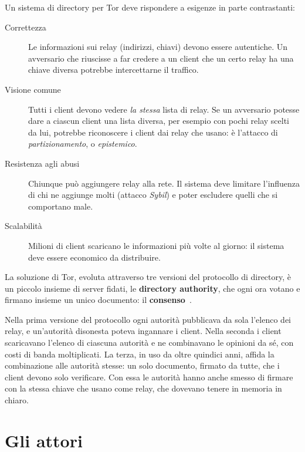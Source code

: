 Un sistema di directory per Tor deve rispondere a esigenze in parte contrastanti:
\begin{description}
  \item[Correttezza] Le informazioni sui relay (indirizzi, chiavi) devono essere autentiche. Un avversario che riuscisse a far credere a un client che un certo relay ha una chiave diversa potrebbe intercettarne il traffico.
  \item[Visione comune] Tutti i client devono vedere \emph{la stessa} lista di relay. Se un avversario potesse dare a ciascun client una lista diversa, per esempio con pochi relay scelti da lui, potrebbe riconoscere i client dai relay che usano: è l'attacco di \emph{partizionamento}, o \emph{epistemico}.
  \item[Resistenza agli abusi] Chiunque può aggiungere relay alla rete. Il sistema deve limitare l'influenza di chi ne aggiunge molti (attacco \emph{Sybil}) e poter escludere quelli che si comportano male.
  \item[Scalabilità] Milioni di client scaricano le informazioni più volte al giorno: il sistema deve essere economico da distribuire.
\end{description}

La soluzione di Tor, evoluta attraverso tre versioni del protocollo di directory, è un piccolo insieme di server fidati, le \textbf{directory authority}, che ogni ora votano e firmano insieme un unico documento: il \textbf{consenso}~.

\begin{storia}
Nella prima versione del protocollo ogni autorità pubblicava da sola l'elenco dei relay, e un'autorità disonesta poteva ingannare i client. Nella seconda i client scaricavano l'elenco di ciascuna autorità e ne combinavano le opinioni da sé, con costi di banda moltiplicati. La terza, in uso da oltre quindici anni, affida la combinazione alle autorità stesse: un solo documento, firmato da tutte, che i client devono solo verificare. Con essa le autorità hanno anche smesso di firmare con la stessa chiave che usano come relay, che dovevano tenere in memoria in chiaro.
\end{storia}

\section{Gli attori}\label{sec:dir-attori}

